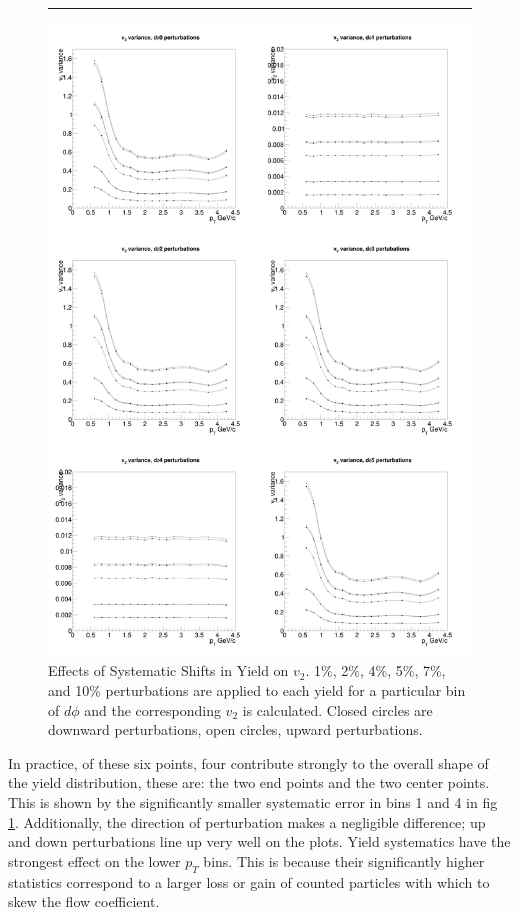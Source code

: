 \advance\headheight-2.5cm
\advance{}
\begin{figure}[hbtp]
    \caption[Effects of Systematic Shifts in Yield on $v_2$.]{Effects of Systematic Shifts in Yield on $v_2$. 1\%, 2\%, 4\%, 5\%, 7\%, and 10\% perturbations are applied to each yield for a particular bin of $d\phi$ and the corresponding $v_2$ is calculated. Closed circles are downward perturbations, open circles, upward perturbations.}
    \rule{35em}{0.5pt}
    \centerline{\includegraphics[width=1\textwidth]{evtQA/plusminusstudy.jpg}}
    \label{fig:wiggleupdown}
\end{figure}

In practice, of these six points, four contribute strongly to the overall shape of the yield distribution, these are: the two end points and the two center points. This is shown by the significantly smaller systematic error in bins 1 and 4 in fig \ref{fig:wiggleupdown}. Additionally, the direction of perturbation makes a negligible difference; up and down perturbations line up very well on the plots. Yield systematics have the strongest effect on the lower $p_T$ bins. This is because their significantly higher statistics correspond to a larger loss or gain of counted particles with which to skew the flow coefficient.


